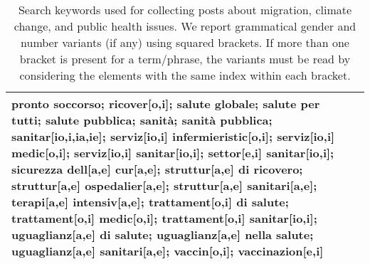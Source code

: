 \begin{table*}
{\begin{tabular}{p{2cm}p{16.5cm}}
        pronto soccorso; 
        ricover[o,i]; 
        salute globale; 
        salute per tutti; 
        salute pubblica; 
        sanità; 
        sanità pubblica; 
        sanitar[io,i,ia,ie]; 
        serviz[io,i] infermieristic[o,i]; 
        serviz[io,i] medic[o,i]; 
        serviz[io,i] sanitar[io,i]; 
        settor[e,i] sanitar[io,i]; 
        sicurezza dell[a,e] cur[a,e]; 
        struttur[a,e] di ricovero; 
        struttur[a,e] ospedalier[a,e]; 
        struttur[a,e] sanitari[a,e]; 
        terapi[a,e] intensiv[a,e]; 
        trattament[o,i] di salute; 
        trattament[o,i] medic[o,i]; 
        trattament[o,i] sanitar[io,i]; 
        uguaglianz[a,e] di salute; 
        uguaglianz[a,e] nella salute; 
        uguaglianz[a,e] sanitari[a,e]; 
        vaccin[o,i]; 
        vaccinazion[e,i]
        \\
        
	\bottomrule
	\end{tabular}
        }%
	\caption{\label{tab:search-keywords} Search keywords used for collecting posts about migration, climate change, and public health issues. We report grammatical gender and number variants (if any) using squared brackets. If more than one bracket is present for a term/phrase, the variants must be read by considering the elements with the same index within each bracket.}
\end{table*}